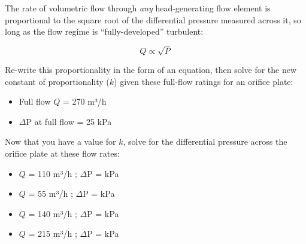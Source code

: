 

The rate of volumetric flow through {\it any} head-generating flow element is proportional to the square root of the differential pressure measured across it, so long as the flow regime is ``fully-developed'' turbulent:

$$Q \propto \sqrt{P}$$

Re-write this proportionality in the form of an equation, then solve for the new constant of proportionality ($k$) given these full-flow ratings for an orifice plate:

\begin{itemize}
\item{} Full flow $Q$ = 270 m³/h
\item{} $\Delta$P at full flow = 25 kPa
\end{itemize}

Now that you have a value for $k$, solve for the differential pressure across the orifice plate at these flow rates:

\begin{itemize}
\item{} $Q$ = 110 m³/h ; $\Delta$P = \underbar{\hskip 50pt} kPa
\vskip 5pt
\item{} $Q$ = 55 m³/h ; $\Delta$P = \underbar{\hskip 50pt} kPa
\vskip 5pt
\item{} $Q$ = 140 m³/h ; $\Delta$P = \underbar{\hskip 50pt} kPa
\vskip 5pt
\item{} $Q$ = 215 m³/h ; $\Delta$P = \underbar{\hskip 50pt} kPa
\end{itemize}

%

